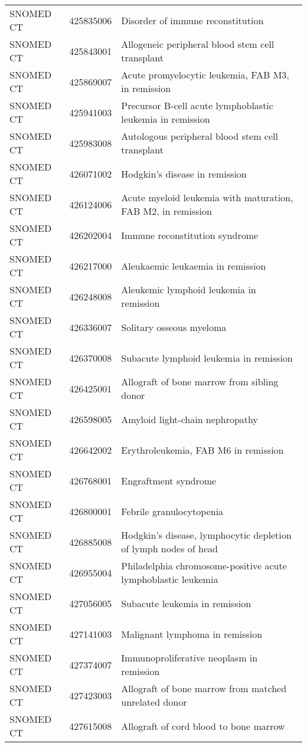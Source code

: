 \begin{table}[ht]
\begin{tabular}{lll}
  SNOMED CT & 425835006 & Disorder of immune reconstitution \\ 
  SNOMED CT & 425843001 & Allogeneic peripheral blood stem cell transplant \\ 
  SNOMED CT & 425869007 & Acute promyelocytic leukemia, FAB M3, in remission \\ 
  SNOMED CT & 425941003 & Precursor B-cell acute lymphoblastic leukemia in remission \\ 
  SNOMED CT & 425983008 & Autologous peripheral blood stem cell transplant \\ 
  SNOMED CT & 426071002 & Hodgkin's disease in remission \\ 
  SNOMED CT & 426124006 & Acute myeloid leukemia with maturation, FAB M2, in remission \\ 
  SNOMED CT & 426202004 & Immune reconstitution syndrome \\ 
  SNOMED CT & 426217000 & Aleukaemic leukaemia in remission \\ 
  SNOMED CT & 426248008 & Aleukemic lymphoid leukemia in remission \\ 
  SNOMED CT & 426336007 & Solitary osseous myeloma \\ 
  SNOMED CT & 426370008 & Subacute lymphoid leukemia in remission \\ 
  SNOMED CT & 426425001 & Allograft of bone marrow from sibling donor \\ 
  SNOMED CT & 426598005 & Amyloid light-chain nephropathy \\ 
  SNOMED CT & 426642002 & Erythroleukemia, FAB M6 in remission \\ 
  SNOMED CT & 426768001 & Engraftment syndrome \\ 
  SNOMED CT & 426800001 & Febrile granulocytopenia \\ 
  SNOMED CT & 426885008 & Hodgkin's disease, lymphocytic depletion of lymph nodes of head \\ 
  SNOMED CT & 426955004 & Philadelphia chromosome-positive acute lymphoblastic leukemia \\ 
  SNOMED CT & 427056005 & Subacute leukemia in remission \\ 
  SNOMED CT & 427141003 & Malignant lymphoma in remission \\ 
  SNOMED CT & 427374007 & Immunoproliferative neoplasm in remission \\ 
  SNOMED CT & 427423003 & Allograft of bone marrow from matched unrelated donor \\ 
  SNOMED CT & 427615008 & Allograft of cord blood to bone marrow \\ 

\end{tabular}
\end{table}
